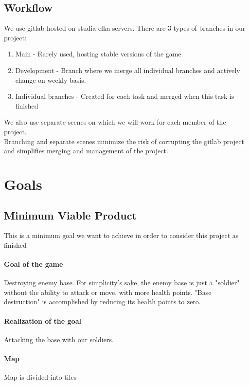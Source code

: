 \documentclass{article}
\begin{document}
\subsection{Workflow}
We use gitlab hosted on studia elka servers. There are 3 types of branches in our project:
\begin{enumerate}
    \item Main - Rarely used, hosting stable versions of the game 
    \item Development - Branch where we merge all individual branches and actively change on weekly basis.
    \item Individual branches - Created for each task and merged when this task is finished
\end{enumerate}
We also use separate scenes on which we will work for each member of the project. \\
Branching and separate scenes minimize the risk of corrupting the gitlab project and simplifies merging and management of the project.

\section{Goals}

\subsection{Minimum Viable Product}
This is a minimum goal we want to achieve in order to consider this project as finished \\ 
\paragraph{Goal of the game} Destroying enemy base. 
For simplicity's sake, the enemy base is just a "soldier" without the ability to attack or move, with more health points. "Base destruction" is accomplished by reducing its health points to zero.
\paragraph{Realization of the goal} Attacking the base with our soldiers.

\paragraph{Map}
Map is divided into tiles
\end{document}
